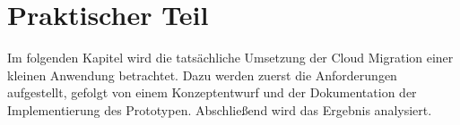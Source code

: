 \chapter{Praktischer Teil}

Im folgenden Kapitel wird die tatsächliche Umsetzung der Cloud Migration einer kleinen Anwendung betrachtet.
Dazu werden zuerst die Anforderungen aufgestellt, gefolgt von einem Konzeptentwurf und der Dokumentation der
Implementierung des Prototypen. Abschließend wird das Ergebnis analysiert.




